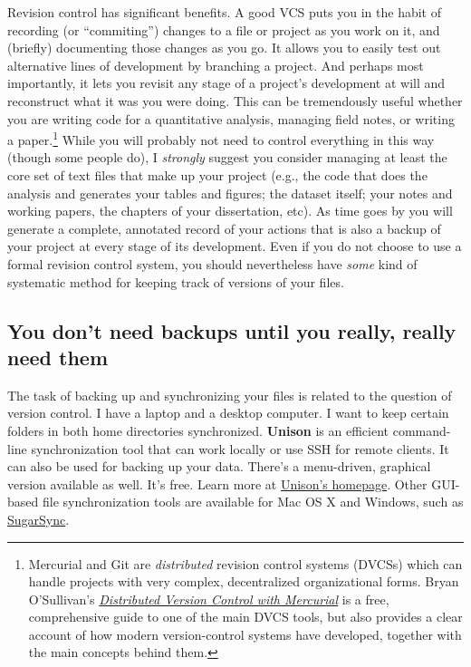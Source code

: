 \documentclass[11pt,article,oneside]{memoir}
\begin{document}
Revision control has significant benefits. A good VCS puts you in the habit of recording (or ``commiting'') changes to a file or project as you work on it, and (briefly) documenting those changes as you go. It allows you to easily test out alternative lines of development by branching a project. And perhaps most importantly, it lets you revisit any stage of a project's development at will and reconstruct what it was you were doing. This can be tremendously useful whether you are writing code for a quantitative analysis, managing field notes, or writing a paper.\footnote{Mercurial and Git are \emph{distributed} revision control systems (DVCSs) which can handle projects with very complex, decentralized organizational forms. Bryan O'Sullivan's \href{http://hgbook.red-bean.com/hgbook.pdf}{\emph{Distributed Version Control with Mercurial}} is a free, comprehensive guide to one of the main DVCS tools, but also provides a clear account of how modern version-control systems have developed, together with the main concepts behind them.} While you will probably not need to control everything in this way (though some people do), I \emph{strongly} suggest you consider managing at least the core set of text files that make up your project (e.g., the code that does the analysis and generates your tables and figures; the dataset itself; your notes and working papers, the chapters of your dissertation, etc). As time goes by you will generate a complete, annotated  record of your actions that is also a backup of your project at every stage of its development. Even if you do not choose to use a formal revision control system, you should nevertheless have \emph{some} kind of systematic method for keeping track of versions of your files. 

\subsection{You don't need backups until you really, really need them}
The task of backing up and synchronizing your files is related to the question of version control. I have a laptop and a desktop computer. I want to keep certain folders in both home directories synchronized. \textbf{Unison} is an efficient command-line synchronization tool that can work locally or use SSH for remote clients. It can also be used for backing up your data. There's a menu-driven, graphical version available as well. It's free. Learn more at \href{http://www.cis.upenn.edu/~bcpierce/unison/}{Unison's homepage}. Other GUI-based file synchronization tools are available for Mac OS X and Windows, such as \href{http://www.sugarsync.com/}{SugarSync}. 
\end{document}
